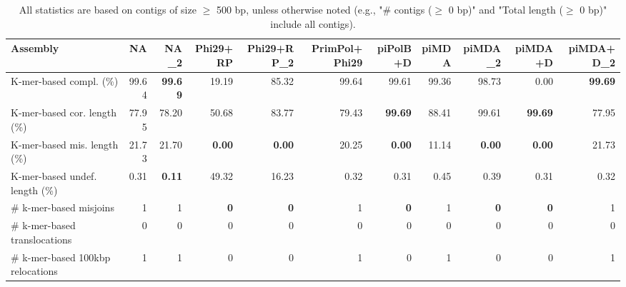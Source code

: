 \documentclass[12pt,a4paper]{article}
\begin{document}
\begin{table}[ht]
\begin{center}
\caption{All statistics are based on contigs of size $\geq$ 500 bp, unless otherwise noted (e.g., "\# contigs ($\geq$ 0 bp)" and "Total length ($\geq$ 0 bp)" include all contigs).}
\begin{tabular}{|l*{10}{|r}|}
\hline
Assembly & NA & NA\_2 & Phi29+RP & Phi29+RP\_2 & PrimPol+Phi29 & piPolB+D & piMDA & piMDA\_2 & piMDA+D & piMDA+D\_2 \\ \hline
K-mer-based compl. (\%) & 99.64 & {\bf 99.69} & 19.19 & 85.32 & 99.64 & 99.61 & 99.36 & 98.73 & 0.00 & {\bf 99.69} \\ \hline
K-mer-based cor. length (\%) & 77.95 & 78.20 & 50.68 & 83.77 & 79.43 & {\bf 99.69} & 88.41 & 99.61 & {\bf 99.69} & 77.95 \\ \hline
K-mer-based mis. length (\%) & 21.73 & 21.70 & {\bf 0.00} & {\bf 0.00} & 20.25 & {\bf 0.00} & 11.14 & {\bf 0.00} & {\bf 0.00} & 21.73 \\ \hline
K-mer-based undef. length (\%) & 0.31 & {\bf 0.11} & 49.32 & 16.23 & 0.32 & 0.31 & 0.45 & 0.39 & 0.31 & 0.32 \\ \hline
\# k-mer-based misjoins & 1 & 1 & {\bf 0} & {\bf 0} & 1 & {\bf 0} & 1 & {\bf 0} & {\bf 0} & 1 \\ \hline
\hspace{5mm}\# k-mer-based translocations & 0 & 0 & 0 & 0 & 0 & 0 & 0 & 0 & 0 & 0 \\ \hline
\hspace{5mm}\# k-mer-based 100kbp relocations & 1 & 1 & 0 & 0 & 1 & 0 & 1 & 0 & 0 & 1 \\ \hline
\end{tabular}
\end{center}
\end{table}
\end{document}
